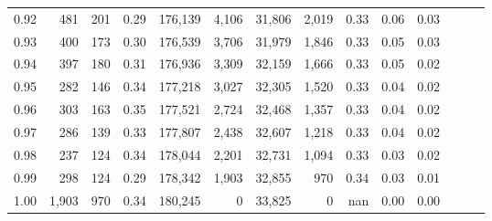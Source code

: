 \begin{tabular}{rrrrrrrrrrrrrr}
0.92 &    481 &  201 &  0.29 &  176,139 &    4,106 &  31,806 &   2,019 &  0.33 &  0.06 &      0.03 \\
0.93 &    400 &  173 &  0.30 &  176,539 &    3,706 &  31,979 &   1,846 &  0.33 &  0.05 &      0.03 \\
0.94 &    397 &  180 &  0.31 &  176,936 &    3,309 &  32,159 &   1,666 &  0.33 &  0.05 &      0.02 \\
0.95 &    282 &  146 &  0.34 &  177,218 &    3,027 &  32,305 &   1,520 &  0.33 &  0.04 &      0.02 \\
0.96 &    303 &  163 &  0.35 &  177,521 &    2,724 &  32,468 &   1,357 &  0.33 &  0.04 &      0.02 \\
0.97 &    286 &  139 &  0.33 &  177,807 &    2,438 &  32,607 &   1,218 &  0.33 &  0.04 &      0.02 \\
0.98 &    237 &  124 &  0.34 &  178,044 &    2,201 &  32,731 &   1,094 &  0.33 &  0.03 &      0.02 \\
0.99 &    298 &  124 &  0.29 &  178,342 &    1,903 &  32,855 &     970 &  0.34 &  0.03 &      0.01 \\
1.00 &  1,903 &  970 &  0.34 &  180,245 &        0 &  33,825 &       0 &   nan &  0.00 &      0.00 \\
\bottomrule
\end{tabular}
